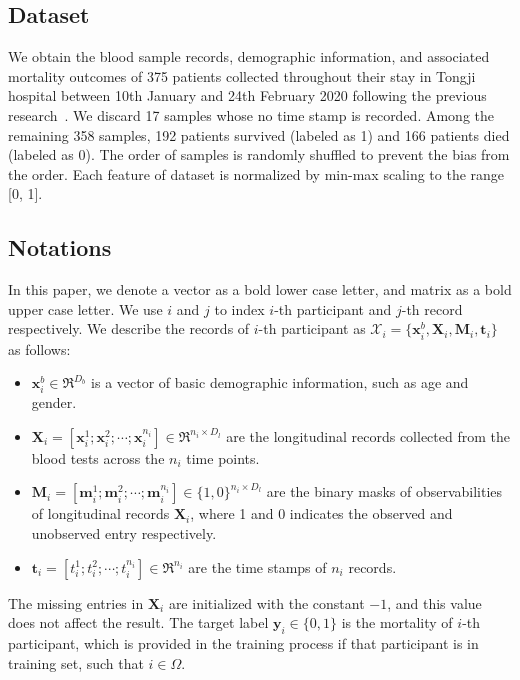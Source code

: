 \subsection{Dataset}
We obtain the blood sample records, demographic information, and associated mortality outcomes of 375 patients collected throughout their stay in Tongji hospital between 10th January and 24th February 2020 following the previous research~\cite{yan2020interpretable}. We discard 17 samples whose no time stamp is recorded. Among the remaining 358 samples, 192 patients survived (labeled as 1) and 166 patients died (labeled as 0). The order of samples is randomly shuffled to prevent the bias from the order. Each feature of dataset is normalized by min-max scaling to the range [0, 1]. 

\subsection{Notations}
In this paper, we denote a vector as a bold lower case letter, and matrix as a bold upper case letter. 
We use $i$ and $j$ to index $i$-th participant and $j$-th record respectively. We describe the records of $i$-th participant as $\mathcal{X}_i = \{\mathbf{x}_i^b, \mathbf{X}_i, \mathbf{M}_i, \mathbf{t}_i\}$ as follows:
\begin{itemize}
    \item $\mathbf{x}_i^b \in \Re^{D_b}$ is a vector of basic demographic information, such as age and gender.
    \item $\mathbf{X}_i = [\mathbf{x}_i^1; \mathbf{x}_i^2; \cdots; \mathbf{x}_i^{n_i}] \in \Re^{n_i \times D_l}$ are the longitudinal records collected from the blood tests across the $n_i$ time points.
    \item $\mathbf{M}_i = [\mathbf{m}_i^1; \mathbf{m}_i^2; \cdots; \mathbf{m}_i^{n_i}] \in \{1, 0\}^{n_i \times D_l}$ are the binary masks of observabilities of longitudinal records $\mathbf{X}_i$, where 1 and 0 indicates the observed and unobserved entry respectively.
    \item $\mathbf{t}_i = [t_i^1; t_i^2; \cdots; t_i^{n_i}] \in \Re^{n_i}$ are the time stamps of $n_i$ records.
\end{itemize}
The missing entries in $\mathbf{X}_i$ are initialized with the constant $-1$, and this value does not affect the result. The target label $\mathbf{y}_i \in \{0, 1\}$ is the mortality of $i$-th participant, which is provided in the training process if that participant is in training set, such that $i \in \Omega$.

